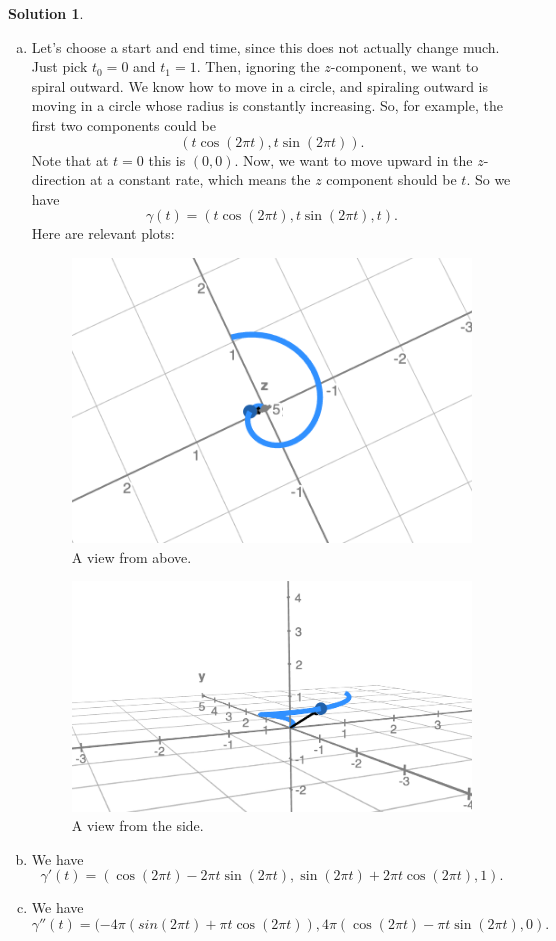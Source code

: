 \documentclass[12pt]{report} %
\theoremstyle{definition}
\newtheorem{solution}{Solution}
\begin{document}
\begin{solution}
\begin{enumerate}[(a)]
    \item Let's choose a start and end time, since this does not actually change much.  Just pick $t_0=0$ and $t_1 = 1$.  Then, ignoring the $z$-component, we want to spiral outward. We know how to move in a circle, and spiraling outward is moving in a circle whose radius is constantly increasing. So, for example, the first two components could be
\[
(t\cos(2\pi t),t\sin(2\pi t)).
\]
Note that at $t=0$ this is $(0,0)$.  Now, we want to move upward in the $z$-direction at a constant rate, which means the $z$ component should be $t$.  So we have
\[
\gamma(t) = (t\cos(2\pi t), t\sin(2\pi t), t).
\]
Here are relevant plots:
\begin{figure}[H]
    \centering
    \includegraphics[width=.6\textwidth]{Images/hwk6above.png}
    \caption{A view from above.}
\end{figure}
\begin{figure}[H]
    \centering
    \includegraphics[width=.6\textwidth]{Images/hwk6side.png}
    \caption{A view from the side.}
\end{figure}
\item We have
\[
\gamma'(t) = (\cos(2\pi t)-2\pi t \sin(2\pi t), \sin(2\pi t) + 2\pi t \cos(2\pi t), 1).
\]
\item We have
\[
\gamma''(t) = (-4\pi(sin(2\pi t)+\pi t \cos(2\pi t)), 4\pi(\cos(2\pi t)-\pi t \sin(2\pi t),0).
\]
\end{enumerate}

\end{solution}
\end{document}
